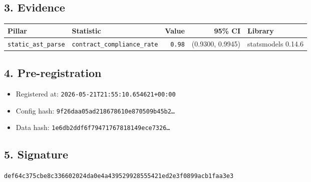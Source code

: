 \documentclass{article}
\begin{document}
\subsection*{3. Evidence}
\begin{tabular}{llrrl}\toprule
\textbf{Pillar} & \textbf{Statistic} & \textbf{Value} & \textbf{95\% CI} & \textbf{Library} \\\midrule
\texttt{static\_ast\_parse} & \texttt{contract\_compliance\_rate} & \texttt{0.98} & (0.9300, 0.9945) & statsmodels 0.14.6 \\
\bottomrule\end{tabular}
\subsection*{4. Pre-registration}
\begin{itemize}
\item Registered at: \texttt{2026-05-21T21:55:10.654621+00:00}
\item Config hash: \texttt{9f26daa05ad218678610e870509b45b2\dots}
\item Data hash: \texttt{1e6db2ddf6f79471767818149ece7326\dots}
\end{itemize}
\subsection*{5. Signature}
\texttt{def64c375cbe8c336602024da0e4a439529928555421ed2e3f0899acb1faa3e3}\\
\end{document}
